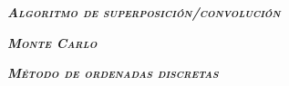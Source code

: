 \documentclass[aspectratio=169,xcolor=dvipsnames,t]{beamer}
\begin{document}


\begin{frame}[standout]
    \centering\LARGE
    \textbf{\itshape\scshape Algoritmo de superposición/convolución}
\end{frame}



\begin{frame}[standout]
    \centering\LARGE
    \textbf{\itshape\scshape Monte Carlo}
\end{frame}



\begin{frame}[standout]
    \centering\LARGE
    \textbf{\itshape\scshape Método de ordenadas discretas}
\end{frame}


\End
\begin{frame}[standout,bg=white.png]
      \centering
      \printbibliography
\end{frame}
\end{document}
